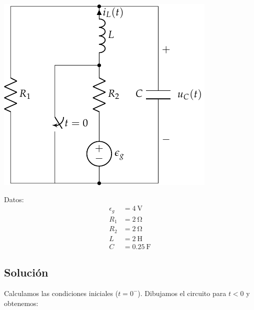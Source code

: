 \documentclass[12pt]{article}
\begin{document}
\begin{minipage}{0.7\textwidth}
  \includegraphics{figs/FM_4_9}
\end{minipage}
\hfill
\begin{minipage}{0.3\textwidth}
  Datos:
  \begin{align*}
    \epsilon_g &= \SI{4}{\volt}\\
    R_1 &= \SI{2}{\ohm}\\
    R_2 &= \SI{2}{\ohm}\\
    L &= \SI{2}{\henry}\\
    C &= \SI{0.25}{\farad}      
  \end{align*}
\end{minipage}

\subsection*{Solución}

Calculamos las condiciones iniciales ($t = 0^-$). Dibujamos el
circuito para $t < 0$ y obtenemos:

\bigskip
\end{document}
